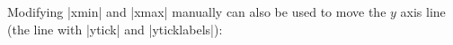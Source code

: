 {\noindent Modifying |xmin| and |xmax| manually can also be used to move the $y$
axis line (the line with |ytick| and |yticklabels|):
%
\begin{codeexample}[]
\end{codeexample}
}

